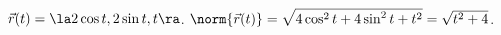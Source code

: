 {$\vec r(t) = \la 2\cos t,2\sin t,t\ra$.
}
{
$\norm {\vec r(t)} = \sqrt{4\cos^2t+4\sin^2 t+t^2} = \sqrt{t^2+4}$.
}

